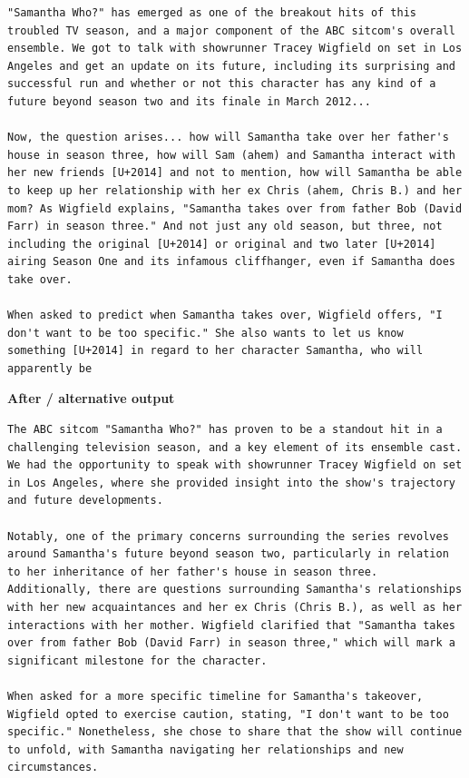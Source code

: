 \begin{Verbatim}
"Samantha Who?" has emerged as one of the breakout hits of this troubled TV season, and a major component of the ABC sitcom's overall ensemble. We got to talk with showrunner Tracey Wigfield on set in Los Angeles and get an update on its future, including its surprising and successful run and whether or not this character has any kind of a future beyond season two and its finale in March 2012...

Now, the question arises... how will Samantha take over her father's house in season three, how will Sam (ahem) and Samantha interact with her new friends [U+2014] and not to mention, how will Samantha be able to keep up her relationship with her ex Chris (ahem, Chris B.) and her mom? As Wigfield explains, "Samantha takes over from father Bob (David Farr) in season three." And not just any old season, but three, not including the original [U+2014] or original and two later [U+2014] airing Season One and its infamous cliffhanger, even if Samantha does take over.

When asked to predict when Samantha takes over, Wigfield offers, "I don't want to be too specific." She also wants to let us know something [U+2014] in regard to her character Samantha, who will apparently be
\end{Verbatim}

\textbf{After / alternative output}

\begin{Verbatim}
The ABC sitcom "Samantha Who?" has proven to be a standout hit in a challenging television season, and a key element of its ensemble cast. We had the opportunity to speak with showrunner Tracey Wigfield on set in Los Angeles, where she provided insight into the show's trajectory and future developments. 

Notably, one of the primary concerns surrounding the series revolves around Samantha's future beyond season two, particularly in relation to her inheritance of her father's house in season three. Additionally, there are questions surrounding Samantha's relationships with her new acquaintances and her ex Chris (Chris B.), as well as her interactions with her mother. Wigfield clarified that "Samantha takes over from father Bob (David Farr) in season three," which will mark a significant milestone for the character.

When asked for a more specific timeline for Samantha's takeover, Wigfield opted to exercise caution, stating, "I don't want to be too specific." Nonetheless, she chose to share that the show will continue to unfold, with Samantha navigating her relationships and new circumstances.
\end{Verbatim}

